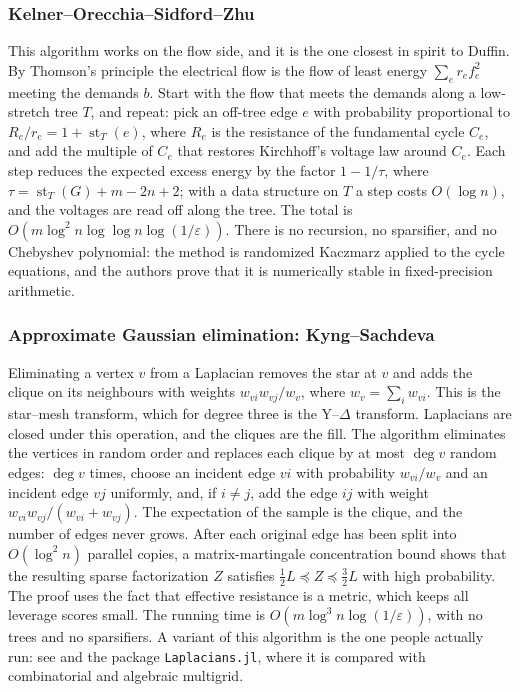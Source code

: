 \documentclass[11pt]{amsart}
\theoremstyle{definition}
\theoremstyle{remark}
\newcommand{\st}{\operatorname{st}}
\newcommand{\lo}{\preccurlyeq}
\newcommand{\eps}{\varepsilon}
\begin{document}
\subsubsection*{Kelner--Orecchia--Sidford--Zhu \cite{KOSZ13}}
This algorithm works on the flow side, and it is the one closest in spirit to Duffin. By Thomson's principle the electrical flow is the flow of least energy $\sum_er_ef_e^2$ meeting the demands $b$.
Start with the flow that meets the demands along a low-stretch tree $T$, and repeat: pick an off-tree edge $e$ with probability proportional to $R_e/r_e=1+\st_T(e)$, where $R_e$ is the resistance of the fundamental cycle $C_e$, and add the multiple of $C_e$ that restores Kirchhoff's voltage law around $C_e$.
Each step reduces the expected excess energy by the factor $1-1/\tau$, where $\tau=\st_T(G)+m-2n+2$; with a data structure on $T$ a step costs $O(\log n)$, and the voltages are read off along the tree. The total is $O(m\log^2n\log\log n\log(1/\eps))$. There is
no recursion, no sparsifier, and no Chebyshev polynomial: the method is randomized Kaczmarz applied to the cycle equations, and the authors prove that it is numerically stable in fixed-precision arithmetic.

\subsubsection*{Approximate Gaussian elimination: Kyng--Sachdeva \cite{KS16}}
Eliminating a vertex $v$ from a Laplacian removes the star at $v$ and adds the clique on its neighbours with weights $w_{vi}w_{vj}/w_v$, where $w_v=\sum_iw_{vi}$. This is the star--mesh transform, which for degree three is the Y--$\Delta$ transform.
Laplacians are closed under this operation, and the cliques are the fill. The algorithm eliminates the vertices in random order and replaces each clique by at most $\deg v$ random edges: $\deg v$ times, choose an incident edge $vi$ with probability $w_{vi}/w_v$ and an incident edge $vj$ uniformly,
and, if $i\ne j$, add the edge $ij$ with weight $w_{vi}w_{vj}/(w_{vi}+w_{vj})$. The expectation of the sample is the clique, and the number of edges never grows. After each original edge has been split into $O(\log^2n)$ parallel copies, a matrix-martingale
concentration bound shows that the resulting sparse factorization $Z$ satisfies $\frac12L\lo Z\lo\frac32L$ with high probability. The proof uses the fact that effective resistance is a metric, which keeps all leverage scores small. The running time is $O(m\log^3n\log(1/\eps))$, with no trees and no sparsifiers.
A variant of this algorithm is the one people actually run: see \cite{GKS23} and the package \texttt{Laplacians.jl}, where it is compared with combinatorial and algebraic multigrid.
\end{document}
